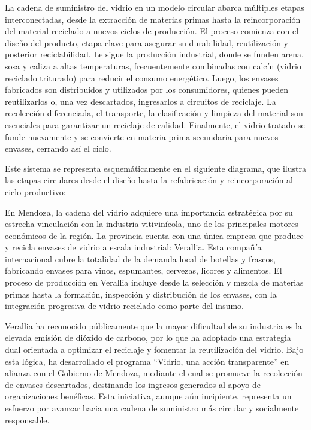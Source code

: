 La cadena de suministro del vidrio en un modelo circular abarca múltiples etapas interconectadas, desde la extracción de materias primas hasta la reincorporación del material reciclado a nuevos ciclos de producción. El proceso comienza con el diseño del producto, etapa clave para asegurar su durabilidad, reutilización y posterior reciclabilidad. Le sigue la producción industrial, donde se funden arena, sosa y caliza a altas temperaturas, frecuentemente combinadas con calcín (vidrio reciclado triturado) para reducir el consumo energético. Luego, los envases fabricados son distribuidos y utilizados por los consumidores, quienes pueden reutilizarlos o, una vez descartados, ingresarlos a circuitos de reciclaje. La recolección diferenciada, el transporte, la clasificación y limpieza del material son esenciales para garantizar un reciclaje de calidad. Finalmente, el vidrio tratado se funde nuevamente y se convierte en materia prima secundaria para nuevos envases, cerrando así el ciclo.

Este sistema se representa esquemáticamente en el siguiente diagrama, que ilustra las etapas circulares desde el diseño hasta la refabricación y reincorporación al ciclo productivo:


En Mendoza, la cadena del vidrio adquiere una importancia estratégica por su estrecha vinculación con la industria vitivinícola, uno de los principales motores económicos de la región. La provincia cuenta con una única empresa que produce y recicla envases de vidrio a escala industrial: Verallia. Esta compañía internacional cubre la totalidad de la demanda local de botellas y frascos, fabricando envases para vinos, espumantes, cervezas, licores y alimentos. El proceso de producción en Verallia incluye desde la selección y mezcla de materias primas hasta la formación, inspección y distribución de los envases, con la integración progresiva de vidrio reciclado como parte del insumo.

Verallia ha reconocido públicamente que la mayor dificultad de su industria es la elevada emisión de dióxido de carbono, por lo que ha adoptado una estrategia dual orientada a optimizar el reciclaje y fomentar la reutilización del vidrio. Bajo esta lógica, ha desarrollado el programa “Vidrio, una acción transparente” en alianza con el Gobierno de Mendoza, mediante el cual se promueve la recolección de envases descartados, destinando los ingresos generados al apoyo de organizaciones benéficas. Esta iniciativa, aunque aún incipiente, representa un esfuerzo por avanzar hacia una cadena de suministro más circular y socialmente responsable.

